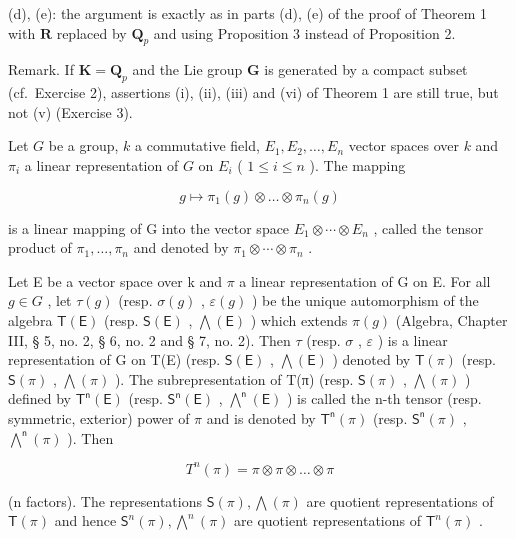 (d), (e): the argument is exactly as in parts (d), (e) of the proof of Theorem 1 with \(\mathbf{R}\) replaced by \(\mathbf{Q}_p\) and using Proposition 3 instead of Proposition 2.

Remark. If \(\mathbf{K} = \mathbf{Q}_p\) and the Lie group \(\mathbf{G}\) is generated by a compact subset (cf.~Exercise 2), assertions (i), (ii), (iii) and (vi) of Theorem 1 are still true, but not (v) (Exercise 3).



Let \(G\) be a group, \(k\) a commutative field, \(E_1, E_2, \ldots, E_n\) vector spaces over \(k\) and \(\pi_i\) a linear representation of \(G\) on \(E_i\) ( \(1 \leqslant i \leqslant n\) ). The mapping

\[
g \mapsto \pi_ {1} (g) \otimes \dots \otimes \pi_ {n} (g)
\]

is a linear mapping of G into the vector space \(E_{1} \otimes \cdots \otimes E_{n}\) , called the tensor product of \(\pi_{1}, \ldots, \pi_{n}\) and denoted by \(\pi_{1} \otimes \cdots \otimes \pi_{n}\) .

Let E be a vector space over k and \(\pi\) a linear representation of G on E. For all \(g \in G\) , let \(\tau(g)\) (resp. \(\sigma(g)\) , \(\varepsilon(g)\) ) be the unique automorphism of the algebra \(\mathsf{T}(\mathsf{E})\) (resp. \(\mathsf{S}(\mathsf{E})\) , \(\bigwedge(\mathsf{E})\) ) which extends \(\pi(g)\) (Algebra, Chapter III, § 5, no. 2, § 6, no. 2 and § 7, no. 2). Then \(\tau\) (resp. \(\sigma\) , \(\varepsilon\) ) is a linear representation of G on T(E) (resp. \(\mathsf{S}(\mathsf{E})\) , \(\bigwedge(\mathsf{E})\) ) denoted by \(\mathsf{T}(\pi)\) (resp. \(\mathsf{S}(\pi)\) , \(\bigwedge(\pi)\) ). The subrepresentation of T(π) (resp. \(\mathsf{S}(\pi)\) , \(\bigwedge(\pi)\) ) defined by \(\mathsf{T}^{\mathsf{n}}(\mathsf{E})\) (resp. \(\mathsf{S}^{\mathsf{n}}(\mathsf{E})\) , \(\bigwedge^{\mathsf{n}}(\mathsf{E})\) ) is called the n-th tensor (resp. symmetric, exterior) power of \(\pi\) and is denoted by \(\mathsf{T}^{\mathsf{n}}(\pi)\) (resp. \(\mathsf{S}^{\mathsf{n}}(\pi)\) , \(\bigwedge^{\mathsf{n}}(\pi)\) ). Then

\[
T ^ {n} (\pi) = \pi \otimes \pi \otimes \dots \otimes \pi
\]

(n factors). The representations \(\mathsf{S}(\pi), \bigwedge (\pi)\) are quotient representations of \(\mathsf{T}(\pi)\) and hence \(\mathsf{S}^n (\pi), \bigwedge^n (\pi)\) are quotient representations of \(\mathsf{T}^n (\pi)\) .

